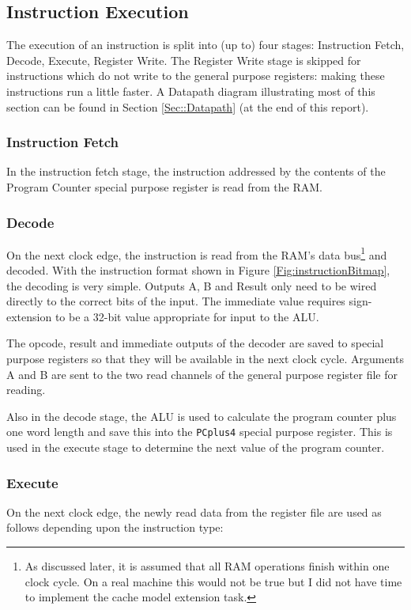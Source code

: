 \documentclass[11pt,a4paper]{IEEEtran}
\begin{document}
		\subsection{Instruction Execution}
		\label{sec:InstructionExec}
			The execution of an instruction is split into (up to) four stages: Instruction Fetch, Decode, Execute, Register Write. The Register Write stage is skipped for instructions which do not write to the general purpose registers: making these instructions run a little faster. A Datapath diagram illustrating most of this section can be found in Section \ref{Sec::Datapath} (at the end of this report).
			
			\subsubsection{Instruction Fetch}
				In the instruction fetch stage, the instruction addressed by the contents of the Program Counter special purpose register is read from the RAM.
				
			\subsubsection{Decode}
				On the next clock edge, the instruction is read from the RAM's data bus\footnote{As discussed later, it is assumed that all RAM operations finish within one clock cycle. On a real machine this would not be true but I did not have time to implement the cache model extension task.} and decoded. With the instruction format shown in Figure \ref{Fig:instructionBitmap}, the decoding is very simple. Outputs A, B and Result only need to be wired directly to the correct bits of the input. The immediate value requires sign-extension to be a 32-bit value appropriate for input to the ALU. 
				
				The opcode, result and immediate outputs of the decoder are saved to special purpose registers so that they will be available in the next clock cycle. Arguments A and B are sent to the two read channels of the general purpose register file for reading. 
				
				Also in the decode stage, the ALU is used to calculate the program counter plus one word length and save this into the \texttt{PCplus4} special purpose register. This is used in the execute stage to determine the next value of the program counter. 
			
			\subsubsection{Execute}
				On the next clock edge, the newly read data from the register file are used as follows depending upon the instruction type:
\end{document}
